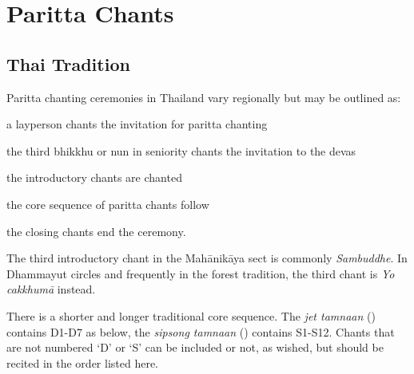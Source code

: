 \chapter{Paritta Chants}

\section{Thai Tradition}

Paritta chanting ceremonies in Thailand vary regionally but may be outlined as:

\begin{packeditemize}
  \item a layperson chants the invitation for paritta chanting
  \item the third bhikkhu or nun in seniority chants the invitation to the devas
  \item the introductory chants are chanted
  \item the core sequence of paritta chants follow
  \item the closing chants end the ceremony.
\end{packeditemize}

The third introductory chant in the Mahānikāya sect is commonly \emph{Sambuddhe}.
In Dhammayut circles and frequently in the forest tradition, the third chant is
\emph{Yo cakkhumā} instead.

There is a shorter and longer traditional core sequence. The \emph{jet tamnaan}
() contains D1-D7 as below, the \emph{sipsong tamnaan}
() contains S1-S12. Chants that are not numbered `D' or `S' can
be included or not, as wished, but should be recited in the order listed here.

\clearpage

\enlargethispage{\baselineskip}


